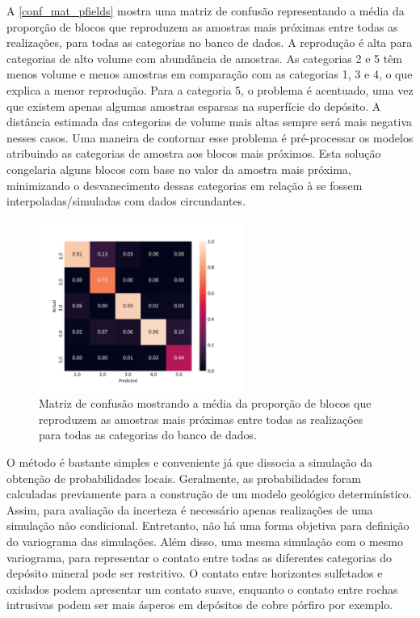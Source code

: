A \autoref{conf_mat_pfields} mostra uma matriz de confusão representando a média da proporção de blocos que reproduzem as amostras mais próximas entre todas as realizações, para todas as categorias no banco de dados. A reprodução é alta para categorias de alto volume com abundância de amostras. As categorias 2 e 5 têm menos volume e menos amostras em comparação com as categorias 1, 3 e 4, o que explica a menor reprodução. Para a categoria 5, o problema é acentuado, uma vez que existem apenas algumas amostras esparsas na superfície do depósito. A distância estimada das categorias de volume mais altas sempre será mais negativa nesses casos. Uma maneira de contornar esse problema é pré-processar os modelos atribuindo as categorias de amostra aos blocos mais próximos. Esta solução congelaria alguns blocos com base no valor da amostra mais próxima, minimizando o desvanecimento dessas categorias em relação à se fossem interpoladas/simuladas com dados circundantes.

\begin{figure}[H]
	\caption{\label{conf_mat_pfields} Matriz de confusão mostrando a média da proporção de blocos que reproduzem as amostras mais próximas entre todas as realizações para todas as categorias do banco de dados.}
	\centering
		\includegraphics[width=0.6\textwidth]{capitulo_3/imagens/backflag.png}
\end{figure}

O método é bastante simples e conveniente já que dissocia a simulação da obtenção de probabilidades locais. Geralmente, as probabilidades foram calculadas previamente para a construção de um modelo geológico determinístico. Assim, para avaliação da incerteza é necessário apenas realizações de uma simulação não condicional. Entretanto, não há uma forma objetiva para definição do variograma das simulações. Além disso, uma mesma simulação com o mesmo variograma, para representar o contato entre todas as diferentes categorias do depósito mineral pode ser restritivo. O contato entre horizontes sulfetados e oxidados podem apresentar um contato suave, enquanto o contato entre rochas intrusivas podem ser mais ásperos em depósitos de cobre pórfiro por exemplo.


